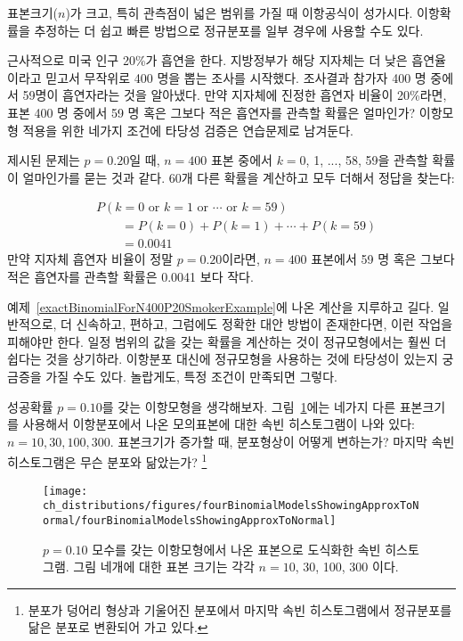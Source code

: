 표본크기($n$)가 크고, 특히 관측점이 넓은 범위를 가질 때 이항공식이 성가시다. 이항확률을 추정하는 더 쉽고 빠른 방법으로 정규분포를 일부 경우에 사용할 수도 있다.

\begin{example}{
근사적으로 미국 인구 20\%가 흡연을 한다. 지방정부가 해당 지자체는 더 낮은 흡연율이라고 믿고서 무작위로 400 명을 뽑는 조사를 시작했다. 조사결과 참가자 400 명 중에서  59명이 흡연자라는 것을 알아냈다. 만약 지자체에 진정한 흡연자 비율이 20\%라면, 표본 400 명 중에서 59 명 혹은 그보다 적은 흡연자를 관측할 확률은 얼마인가? }\label{exactBinomialForN400P20SmokerExample}
이항모형 적용을 위한 네가지 조건에 타당성 검증은 연습문제로 남겨둔다.

제시된 문제는 $p=0.20$일 때, $n=400$ 표본 중에서 $k=0$, 1, ..., 58, 59을 관측할 확률이 얼마인가를 묻는 것과 같다. 60개 다른 확률을 계산하고 모두 더해서 정답을 찾는다:

\begin{align*}
&P(k=0\text{ or }k=1\text{ or }\cdots\text{ or } k=59) \\
	&\qquad= P(k=0) + P(k=1) + \cdots + P(k=59) \\
	&\qquad=0.0041
\end{align*}
만약 지자체 흡연자 비율이 정말 $p=0.20$이라면, $n=400$ 표본에서  59 명 혹은 그보다 적은 흡연자를 관측할 확률은 0.0041 보다 작다.
\end{example}

예제~\ref{exactBinomialForN400P20SmokerExample}에 나온 계산을 지루하고 길다. 일반적으로, 더 신속하고, 편하고, 그럼에도 정확한 대안 방법이 존재한다면, 이런 작업을 피해야만 한다. 일정 범위의 값을 갖는 확률을 계산하는 것이 정규모형에서는 훨씬 더 쉽다는 것을 상기하라. 이항분포 대신에 정규모형을 사용하는 것에 타당성이 있는지 궁금증을 가질 수도 있다. 놀랍게도, 특정 조건이 만족되면 그렇다. 

\begin{exercise}
성공확률 $p=0.10$를 갖는 이항모형을 생각해보자. 그림~\ref{fourBinomialModelsShowingApproxToNormal}에는 네가지 다른 표본크기를 사용해서 이항분포에서 나온 모의표본에 대한 속빈 히스토그램이 나와 있다: $n=10, 30, 100, 300$. 표본크기가 증가할 때, 분포형상이 어떻게 변하는가? 마지막 속빈 히스토그램은 무슨 분포와 닮았는가?
\footnote{분포가 덩어리 형상과 기울어진 분포에서 마지막 속빈 히스토그램에서 정규분포를 닮은 분포로 변환되어 가고 있다.}
\end{exercise}

\begin{figure}[h]
\centering
\texttt{[image: ch\_distributions/figures/fourBinomialModelsShowingApproxToNormal/fourBinomialModelsShowingApproxToNormal]}
\caption{$p=0.10$ 모수를 갖는 이항모형에서 나온 표본으로 도식화한 속빈 히스토그램. 그림 네개에 대한 표본 크기는 각각 $n=10$, 30, 100, 300 이다.}
\label{fourBinomialModelsShowingApproxToNormal}
\end{figure}

